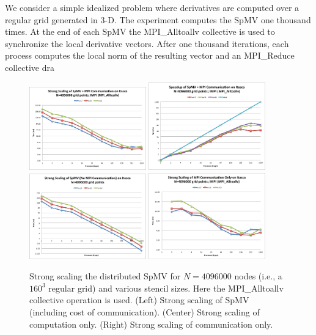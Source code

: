\documentclass{report}
\begin{document}
We consider a simple idealized problem where derivatives are computed over a regular grid generated in 3-D. The experiment computes the SpMV one thousand times. At the end of each SpMV the MPI\_Alltoallv collective is used to synchronize the local derivative vectors. After one thousand iterations, each process computes the local norm of the resulting vector and an MPI\_Reduce collective dra


\begin{figure} 
\centering
\includegraphics[width=0.45\textwidth]{performance_content/scaling/strong_scaling_4M_regular_alltoallv.png}  
\includegraphics[width=0.45\textwidth]{performance_content/scaling/strong_scaling_4M_regular_alltoallv_speedup.png} \\
\includegraphics[width=0.45\textwidth]{performance_content/scaling/strong_scaling_4M_regular_spmvOnly.png}
\includegraphics[width=0.45\textwidth]{performance_content/scaling/strong_scaling_4M_regular_alltoallv_commOnly.png} 
\caption{Strong scaling the distributed SpMV for $N=4096000$ nodes (i.e., a $160^3$ regular grid) and various stencil sizes. Here the MPI\_Alltoallv collective operation is used. (Left) Strong scaling of SpMV (including cost of communication). (Center) Strong scaling of computation only. (Right) Strong scaling of communication only.}
\end{figure}
\end{document}
